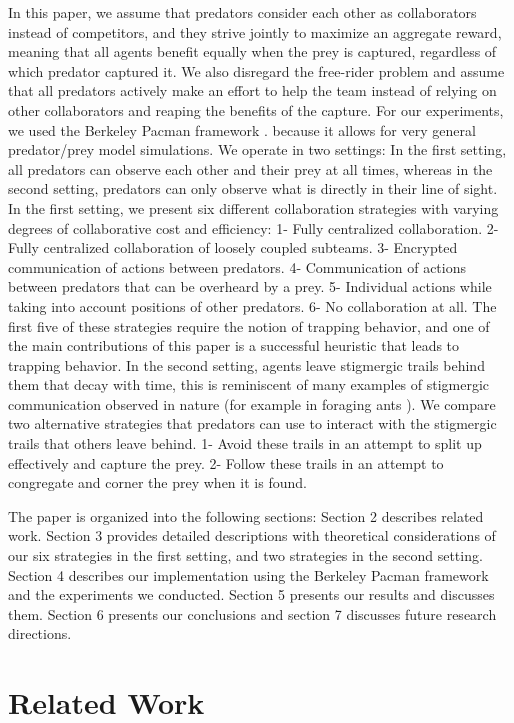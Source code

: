 \documentclass[11pt]{article}
\begin{document}
In this paper, we assume that predators consider each other as collaborators instead of competitors, and they strive jointly to maximize an aggregate reward, meaning that all agents benefit equally when the prey is captured, regardless of which predator captured it. We also disregard the free-rider problem and assume that all predators actively make an effort to help the team instead of relying on other collaborators and reaping the benefits of the capture. For our experiments, we used the Berkeley Pacman framework \cite{Pacman}. because it allows for very general predator/prey model simulations. We operate in two settings: In the first setting, all predators can observe each other and their prey at all times, whereas in the second setting, predators can only observe what is directly in their line of sight. In the first setting, we present six different collaboration strategies with varying degrees of collaborative cost and efficiency: 1- Fully centralized collaboration. 2- Fully centralized collaboration of loosely coupled subteams. 3- Encrypted communication of actions between predators. 4- Communication of actions between predators that can be overheard by a prey. 5- Individual actions while taking into account positions of other predators. 6- No collaboration at all. The first five of these strategies require the notion of trapping behavior, and one of the main contributions of this paper is a successful heuristic that leads to trapping behavior. In the second setting, agents leave stigmergic trails behind them that decay with time, this is reminiscent of many examples of stigmergic communication observed in nature (for example in foraging ants \cite{beckers1992trails}). We compare two alternative strategies that predators can use to interact with the stigmergic trails that others leave behind. 1- Avoid these trails in an attempt to split up effectively and capture the prey. 2- Follow these trails in an attempt to congregate and corner the prey when it is found.

The paper is organized into the following sections: Section 2 describes related work. Section 3 provides detailed descriptions with theoretical considerations of our six strategies in the first setting, and two strategies in the second setting. Section 4 describes our implementation using the Berkeley Pacman framework and the experiments we conducted. Section 5 presents our results and discusses them. Section 6 presents our conclusions and section 7 discusses future research directions. 

\section{Related Work}
\end{document}
